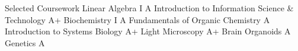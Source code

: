 \begin{rubric}{Selected Coursework}
\entry*[] Linear Algebra I \hfill A
\entry*[] Introduction to Information Science \& Technology \hfill A+
\entry*[] Biochemistry I \hfill A
\entry*[] Fundamentals of Organic Chemistry \hfill A
\entry*[] Introduction to Systems Biology \hfill A+
\entry*[] Light Microscopy \hfill A+
\entry*[] Brain Organoids \hfill A
\entry*[] Genetics \hfill A
\end{rubric}
